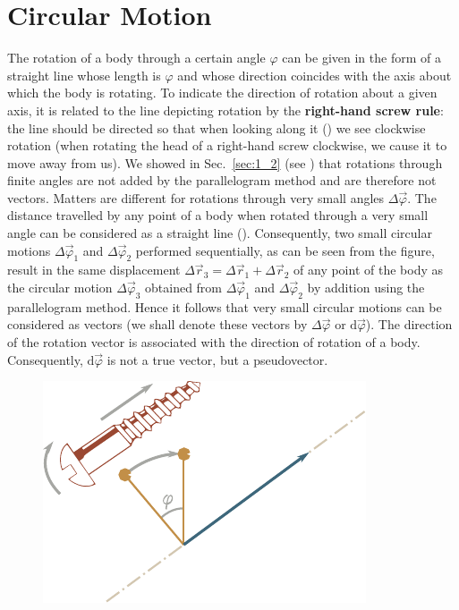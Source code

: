 \section{Circular Motion}\label{sec:1_5}

The rotation of a body through a certain angle $\varphi$ can be given in the form of a straight line whose length is $\varphi$ and whose direction coincides with the axis about which the body is rotating. To indicate the direction of rotation about a given axis, it is related to the line depicting rotation by the \textbf{right-hand screw rule}: the line should be directed so that when looking along it () we see clockwise rotation (when rotating the head of a right-hand screw clockwise, we cause it to move away from us). We showed in Sec.~\ref{sec:1_2} (see ) that rotations through finite angles are not added by the parallelogram method and are therefore not vectors. Matters are different for rotations through very small angles $\Delta\vec{\varphi}$. The distance travelled by any point of a body when rotated through a very small angle can be considered as a straight line (). Consequently, two small circular motions $\Delta\vec{\varphi}_1$ and $\Delta\vec{\varphi}_2$ performed sequentially, as can be seen from the figure, result in the same displacement $\Delta\vec{r}_3=\Delta\vec{r}_1+\Delta\vec{r}_2$ of any point of the body as the circular motion $\Delta\vec{\varphi}_3$ obtained from $\Delta\vec{\varphi}_1$ and $\Delta\vec{\varphi}_2$ by addition using the parallelogram method. Hence it follows that very small circular motions can be considered as vectors (we shall denote these vectors by $\Delta\vec{\varphi}$ or $\mathrm{d}\vec{\varphi}$). The direction of the rotation vector is associated with the direction of rotation of a body. Consequently, $\mathrm{d}\vec{\varphi}$ is not a true vector, but a pseudovector.

\begin{figure}[t]
	\begin{center}
		\includegraphics[scale=0.95]{figures/ch_01/fig_1_29.pdf}
		\caption[]{}
		\label{fig:1_29}
	\end{center}
	\vspace{-0.7cm}
\end{figure}

